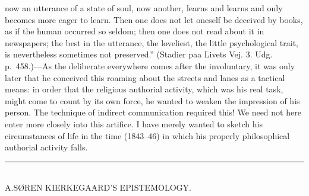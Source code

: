 \documentclass[12pt,a4paper]{book}
\newcommand{\opage}[1]{\marginnote{\footnotesize\textit{[#1]}}}
\begin{document}
now an utterance of a state of soul, now another, learns and learns and
only becomes more eager to learn. Then one does not let oneself be
deceived by books, as if the human occurred so seldom; then one does not
read about it in newspapers; the best in the utterance, the loveliest,
the little psychological trait, is nevertheless sometimes not
preserved.''
(Stadier paa Livets Vej. 3. Udg.
\opage{58}p.~458.)---As the deliberate everywhere comes after the involuntary, it
was only later that he conceived this roaming about the streets and lanes
as a tactical means: in order that the religious authorial activity,
which was his real task, might come to count by its own force, he wanted
to weaken the impression of his person. The technique of indirect
communication required this! We need not here enter more closely into
this artifice. I have merely wanted to sketch his circumstances of life
in the time (1843--46) in which his properly philosophical authorial
activity falls.

\begin{center}\rule{1.5cm}{0.4pt}\\[18pt] A.\quad SØREN KIERKEGAARD'S EPISTEMOLOGY.\end{center}
\end{document}
